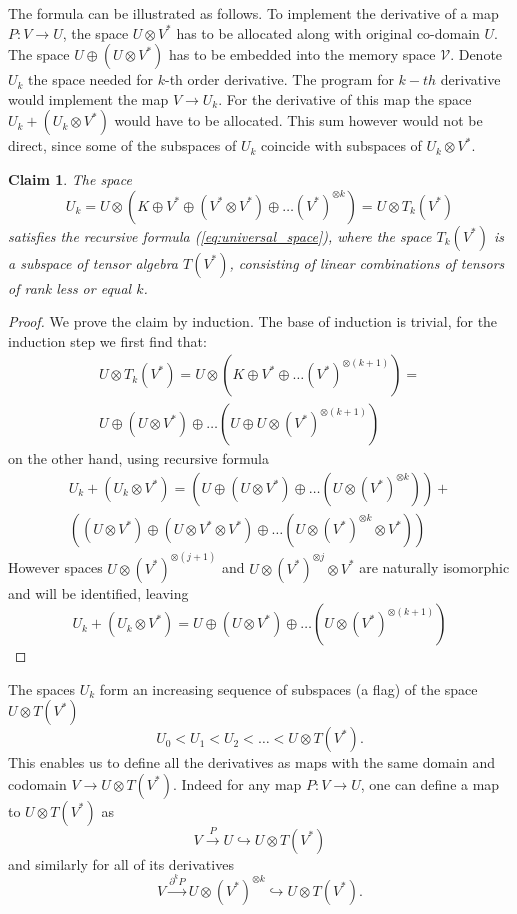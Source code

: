 \documentclass[preprint,12pt]{elsarticle}
\newcommand{\VV}{\mathcal{V}}
\newcommand{\D}{\partial}
\newtheorem{trditev}{Claim}[section]
\begin{document}
The formula can be illustrated as follows. 
To implement the derivative of a map $P:V\to U$, the space $U\otimes V^*$ has to
be allocated along with original co-domain $U$.  The space $U\oplus
(U\otimes V^*)$ has to be embedded into the memory space $\VV$.
Denote $U_k$ the space needed for $k$-th order derivative. The program for
$k-th$ derivative would implement the map $V\to U_k$. For the derivative of this map
the space $U_k+ (U_k\otimes V^*)$ would have to be allocated. This sum
however would not be direct, since some of the subspaces of $U_k$ coincide with
subspaces of $U_k\otimes V^*$.
\begin{trditev}
  The space
  \begin{equation}
    \label{eq:k-th-virtual-space}
    U_k = U\otimes \left(K\oplus V^* \oplus (V^*\otimes V^*)\oplus\ldots
      (V^*)^{\otimes k}\right) = U\otimes T_k(V^*)
  \end{equation}
  satisfies the recursive formula (\ref{eq:universal_space}), where the space
  $T_k(V^*)$ is a subspace of \emph{tensor algebra} $T(V^*)$, consisting of linear
  combinations of tensors of rank less or equal $k$.
\end{trditev}

\begin{proof}
  We prove the claim by induction. The base of induction is trivial, for the
  induction step we first find that:
  \begin{multline*}
    U\otimes T_k(V^*)=U\otimes(K\oplus V^*\oplus\ldots (V^*)^{\otimes (k+1)})=\\
    U\oplus (U\otimes V^*)\oplus\ldots (U\oplus U\otimes(V^*)^{\otimes (k+1)})
  \end{multline*}
  on the other hand, using recursive formula
  \begin{multline}
    U_k+(U_k\otimes V^*) = \left( U\oplus (U\otimes V^*)\oplus\ldots (U\otimes(V^*)^{\otimes k})\right) + \\
    \left((U\otimes V^*) \oplus (U\otimes V^*\otimes V^*) \oplus\ldots
      (U\otimes(V^*)^{\otimes k}\otimes V^*)\right)
  \end{multline}
  However spaces $U\otimes(V^*)^{\otimes (j+1)}$ and $U\otimes (V^*)^{\otimes
    j}\otimes V^*$ are naturally isomorphic and will be identified, leaving
  \begin{equation}
    U_k+(U_k\otimes V^*) = U\oplus (U\otimes V^*)\oplus\ldots (U\otimes(V^*)^{\otimes (k+1)})
  \end{equation}
\end{proof}
The spaces $U_k$ form an increasing sequence of subspaces (a flag) of the space $U\otimes
T(V^*)$
\begin{equation}
  \label{eq:flag}
  U_0<U_1<U_2<\ldots < U\otimes T(V^*).
\end{equation}
This enables us to define all the derivatives as maps with
the same domain and codomain $V\to U\otimes T(V^*)$. Indeed for any map $P:V\to
U$, one can define a map to $U\otimes T(V^*)$ as
$$V\xrightarrow{P}U\hookrightarrow U\otimes T(V^*)$$ and similarly  for all of its
derivatives
$$V\xrightarrow{\D^k P} U\otimes (V^*)^{\otimes k}\hookrightarrow U\otimes
T(V^*).$$
\end{document}
